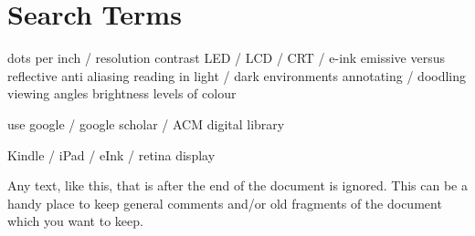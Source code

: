 \section{Search Terms}
\label{appendix:searchterms}

dots per inch  / resolution
contrast
LED / LCD / CRT / e-ink
emissive versus reflective
anti aliasing
reading in light / dark environments
annotating / doodling
viewing angles
brightness
levels of colour

use google / google scholar / ACM digital library



Kindle / iPad / eInk / retina display


 

Any text, like this, that is after the end of the document is ignored. This can be a
handy place to keep general comments and/or old fragments of the document
which you want to keep.

